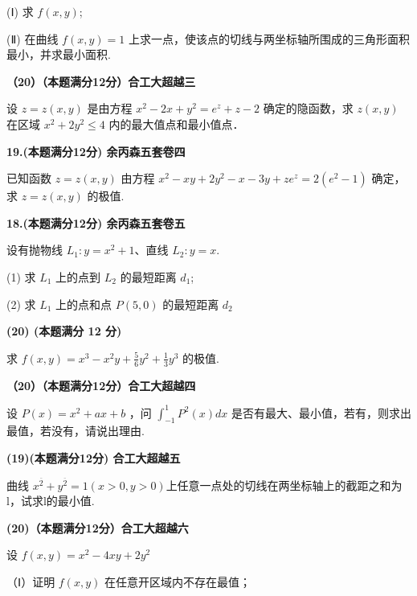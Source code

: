 \documentclass[a4paper,12pt]{article}
\begin{document}
(Ⅰ) 求 $f(x, y)$;

(Ⅱ) 在曲线 $f(x,y)=1$ 上求一点，使该点的切线与两坐标轴所围成的三角形面积最小，并求最小面积.

\vspace{0.5cm}

\textbf{（20）（本题满分12分）合工大超越三}

设 $z=z(x,y)$ 是由方程 $x^{2}-2x+y^{2}=e^{z}+z-2$ 确定的隐函数，求 $z(x,y)$ 在区域 $x^{2}+2y^{2}\leqslant4$ 内的最大值点和最小值点．

\vspace{0.5cm}

\textbf{19.(本题满分12分) 余丙森五套卷四}

已知函数 $z = z(x, y)$ 由方程 $x^{2} - xy + 2y^{2} - x - 3y + ze^{z} = 2(e^{2} - 1)$ 确定，求 $z = z(x, y)$ 的极值.

\vspace{0.5cm}

\textbf{18.(本题满分12分) 余丙森五套卷五}

设有抛物线 $L_{1}: y = x^{2} + 1$、直线 $L_{2}: y = x$.

(1) 求 $L_{1}$ 上的点到 $L_{2}$ 的最短距离 $d_{1}$;

(2) 求 $L_{1}$ 上的点和点 $P(5,0)$ 的最短距离 $d_{2}$

\vspace{0.5cm}

\textbf{(20) (本题满分 12 分)}

求 $f(x,y)=x^{3}-x^{2}y+\frac{5}{6}y^{2}+\frac{1}{3}y^{3}$ 的极值.

\vspace{0.5cm}

\textbf{（20）（本题满分12分）合工大超越四}

设 $P(x)=x^{2}+ax+b$ ，问 $\int_{-1}^{1}P^{2}(x)dx$ 是否有最大、最小值，若有，则求出最值，若没有，请说出理由.

\vspace{0.5cm}

\textbf{(19)(本题满分12分) 合工大超越五}

曲线 $x^{\overline{2}}+y^{\overline{2}}=1(x>0,y>0)$上任意一点处的切线在两坐标轴上的截距之和为l，试求l的最小值.

\vspace{0.5cm}

\textbf{(20)（本题满分12分）合工大超越六}

设 $f(x,y)=x^{2}-4xy+2y^{2}$

（Ⅰ）证明 $f(x,y)$ 在任意开区域内不存在最值；
\end{document}
